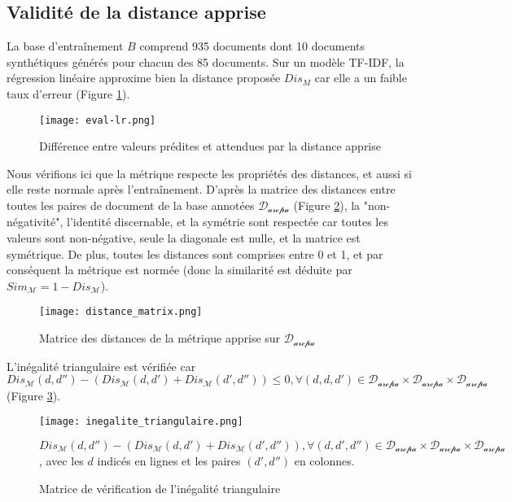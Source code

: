 \subsection{Validité de la distance apprise}
La base d'entraînement $B$ comprend 935 documents dont 10 documents synthétiques générés pour chacun des 85 documents. Sur un modèle TF-IDF, la régression linéaire approxime bien la distance proposée $Dis_M$ car elle a un faible taux d'erreur (Figure \ref{fig:similarite:eval-regression}).

\begin{figure}[!htb]
 	\centering \texttt{[image: eval-lr.png]} \hfil
	
	\caption{Différence entre valeurs prédites et  attendues par la distance apprise}\label{fig:similarite:eval-regression}
\end{figure}

Nous vérifions ici que la métrique respecte les propriétés des distances, et aussi si elle reste normale après l'entraînement. D'après la matrice des distances entre toutes les paires de document de la base annotées $\mathcal{D_{\text{arcpa}}}$ (Figure \ref{fig:similarite:distance_matrix}),  la "non-négativité", l'identité discernable, et la symétrie sont respectée car toutes les valeurs sont non-négative, seule la diagonale est nulle, et la matrice est symétrique. De plus, toutes les distances sont comprises entre 0 et 1, et par conséquent la métrique est normée (donc la similarité est déduite par $Sim_\mathcal{M} = 1 - Dis_\mathcal{M}$).

\begin{figure}[!htb]
	\centering \texttt{[image: distance\_matrix.png]}
	\caption{Matrice des distances de la métrique apprise sur $\mathcal{D_{\text{arcpa}}}$}\label{fig:similarite:distance_matrix}
\end{figure}

L'inégalité triangulaire est vérifiée car $Dis_\mathcal{M}(d,d'') - (Dis_\mathcal{M}(d,d') + Dis_\mathcal{M}(d',d'')) \leq 0, \forall (
d,d,d') \in \mathcal{D_{\text{arcpa}}} \times \mathcal{D_{\text{arcpa}}} \times \mathcal{D_{\text{arcpa}}}$ (Figure \ref{fig:similarite:matrice_inegalite_triangulaire}).

\begin{figure}[!htb]
	\centering \texttt{[image: inegalite\_triangulaire.png]}
	
	\scriptsize{$Dis_\mathcal{M}(d,d'') - (Dis_\mathcal{M}(d,d') + Dis_\mathcal{M}(d',d'')), \forall (d,d',d'') \in \mathcal{D_{\text{arcpa}}} \times \mathcal{D_{\text{arcpa}}} \times \mathcal{D_{\text{arcpa}}}$, avec les $d$ indicés en lignes et les paires $(d',d'')$ en colonnes.}
	\caption{Matrice de vérification de l'inégalité triangulaire}\label{fig:similarite:matrice_inegalite_triangulaire}
\end{figure}
 

